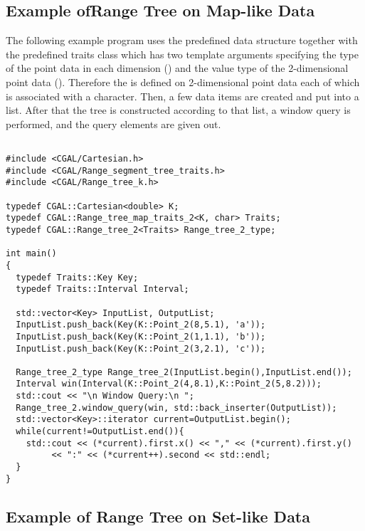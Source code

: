 \subsection{Example ofRange Tree on Map-like Data}
\label{sec:range_tree_ex}

The following example program uses the predefined  data structure together with the predefined traits
  class  which has two template
  arguments specifying the
  type of the point data in each dimension
  () and the value type of the
  2-dimensional point data (). Therefore the  is defined on 2-dimensional point data each of which is
  associated with a character.
Then, a few data items are created and put into a list. After
  that the tree is constructed according to that list, a window
  query is performed, and the query elements are given out.

\begin{verbatim}

#include <CGAL/Cartesian.h>
#include <CGAL/Range_segment_tree_traits.h>
#include <CGAL/Range_tree_k.h>

typedef CGAL::Cartesian<double> K;
typedef CGAL::Range_tree_map_traits_2<K, char> Traits;
typedef CGAL::Range_tree_2<Traits> Range_tree_2_type;

int main()
{
  typedef Traits::Key Key;                
  typedef Traits::Interval Interval;    

  std::vector<Key> InputList, OutputList;
  InputList.push_back(Key(K::Point_2(8,5.1), 'a'));
  InputList.push_back(Key(K::Point_2(1,1.1), 'b'));
  InputList.push_back(Key(K::Point_2(3,2.1), 'c'));

  Range_tree_2_type Range_tree_2(InputList.begin(),InputList.end());
  Interval win(Interval(K::Point_2(4,8.1),K::Point_2(5,8.2)));
  std::cout << "\n Window Query:\n ";
  Range_tree_2.window_query(win, std::back_inserter(OutputList));
  std::vector<Key>::iterator current=OutputList.begin();
  while(current!=OutputList.end()){
    std::cout << (*current).first.x() << "," << (*current).first.y()
         << ":" << (*current++).second << std::endl;
  }
}
\end{verbatim}



\subsection{Example of Range Tree on Set-like Data}

